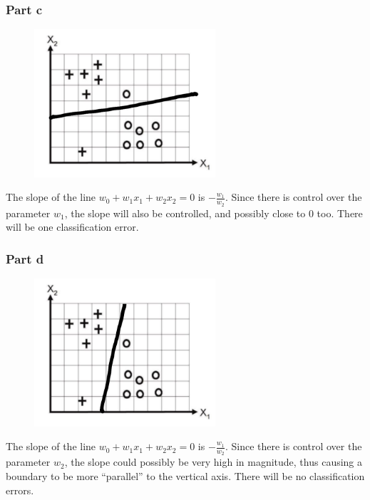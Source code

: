 \documentclass{article}
\begin{document}
\subsubsection*{Part c}
\begin{minipage}{0.475\linewidth}
\begin{figure}[H]
\centering
\includegraphics[width=0.6\textwidth]{./images/8_7_c.jpg}
\end{figure}
\end{minipage}
\hfill
\begin{minipage}{0.475\linewidth}
The slope of the line \(w_{0} + w_{1}x_{1} + w_{2}x_{2} = 0\) is \(-\frac{w_{1}}{w_{2}}\). Since there is control over the parameter \(w_{1}\), the slope will also be controlled, and possibly close to \(0\) too. There will be one classification error.
\end{minipage}

\subsubsection*{Part d}
\begin{minipage}{0.475\linewidth}
\begin{figure}[H]
\centering
\includegraphics[width=0.6\textwidth]{./images/8_7_d.jpg}
\end{figure}
\end{minipage}
\hfill
\begin{minipage}{0.475\linewidth}
The slope of the line \(w_{0} + w_{1}x_{1} + w_{2}x_{2} = 0\) is \(-\frac{w_{1}}{w_{2}}\). Since there is control over the parameter \(w_{2}\), the slope could possibly be very high in magnitude, thus causing a boundary to be more ``parallel'' to the vertical axis. There will be no classification errors.
\end{minipage}
\end{document}
